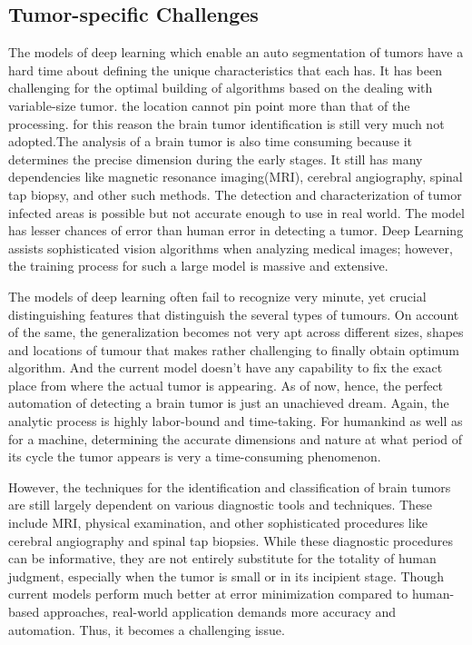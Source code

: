 \documentclass[conference]{IEEEtran}
\begin{document}
\subsection{Tumor-specific Challenges}
The models of deep learning which enable an auto segmentation of tumors have a hard time about defining the unique characteristics that each has. It has been challenging for the optimal building of algorithms based on the dealing with variable-size tumor. the location cannot pin point more than that of the processing. for this reason the brain tumor identification is still very much not adopted.The analysis of a brain tumor is also time consuming because it determines the precise dimension during the early stages\cite{b8}. It still has many dependencies like magnetic resonance imaging(MRI), cerebral angiography, spinal tap biopsy, and other such methods\cite{b8}. The detection and characterization of tumor infected areas is possible but not accurate enough to use in real world\cite{b8}. The model has lesser chances of error than human error in detecting a tumor. Deep Learning assists sophisticated vision algorithms when analyzing medical images; however, the training process for such a large model is massive and extensive.

The models of deep learning often fail to recognize very minute, yet crucial distinguishing features that distinguish the several types of tumours. On account of the same, the generalization becomes not very apt across different sizes, shapes and locations of tumour that makes rather challenging to finally obtain optimum algorithm. And the current model doesn't have any capability to fix the exact place from where the actual tumor is appearing. As of now, hence, the perfect automation of detecting a brain tumor is just an unachieved dream. Again, the analytic process is highly labor-bound and time-taking. For humankind as well as for a machine, determining the accurate dimensions and nature at what period of its cycle the tumor appears is very a time-consuming phenomenon.

However, the techniques for the identification and classification of brain tumors are still largely dependent on various diagnostic tools and techniques. These include MRI, physical examination, and other sophisticated procedures like cerebral angiography and spinal tap biopsies. While these diagnostic procedures can be informative, they are not entirely substitute for the totality of human judgment, especially when the tumor is small or in its incipient stage. Though current models perform much better at error minimization compared to human-based approaches, real-world application demands more accuracy and automation. Thus, it becomes a challenging issue.
\end{document}
